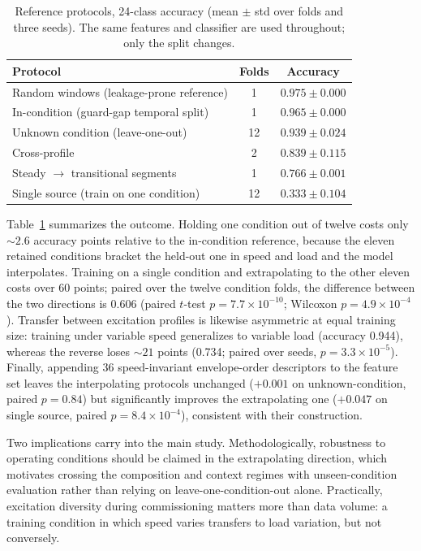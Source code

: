 \begin{table}[!t]
\caption{Reference protocols, 24-class accuracy (mean $\pm$ std over folds
and three seeds). The same features and classifier are used throughout; only
the split changes.}
\label{tab:condref}
\centering
\footnotesize
\setlength{\tabcolsep}{5pt}
\begin{tabular}{l c c}
\hline
Protocol & Folds & Accuracy \\
\hline
Random windows (leakage-prone reference) & 1 & $0.975 \pm 0.000$ \\
In-condition (guard-gap temporal split)  & 1 & $0.965 \pm 0.000$ \\
Unknown condition (leave-one-out)        & 12 & $0.939 \pm 0.024$ \\
Cross-profile                            & 2 & $0.839 \pm 0.115$ \\
Steady $\rightarrow$ transitional segments & 1 & $0.766 \pm 0.001$ \\
Single source (train on one condition)   & 12 & $0.333 \pm 0.104$ \\
\hline
\end{tabular}
\end{table}

Table~\ref{tab:condref} summarizes the outcome. Holding one condition out of
twelve costs only ${\sim}2.6$ accuracy points relative to the in-condition
reference, because the eleven retained conditions bracket the held-out one
in speed and load and the model interpolates. Training on a single condition
and extrapolating to the other eleven costs over 60 points; paired over the
twelve condition folds, the difference between the two directions is 0.606
(paired $t$-test $p = 7.7\times10^{-10}$; Wilcoxon $p = 4.9\times10^{-4}$).
Transfer between excitation profiles is likewise asymmetric at equal
training size: training under variable speed generalizes to variable load
(accuracy 0.944), whereas the reverse loses ${\sim}21$ points (0.734; paired
over seeds, $p = 3.3\times10^{-5}$). Finally, appending 36 speed-invariant
envelope-order descriptors to the feature set leaves the interpolating
protocols unchanged ($+0.001$ on unknown-condition, paired $p = 0.84$) but
significantly improves the extrapolating one ($+0.047$ on single source,
paired $p = 8.4\times10^{-4}$), consistent with their construction.

Two implications carry into the main study. Methodologically, robustness to
operating conditions should be claimed in the extrapolating direction, which
motivates crossing the composition and context regimes with unseen-condition
evaluation rather than relying on leave-one-condition-out alone.
Practically, excitation diversity during commissioning matters more than
data volume: a training condition in which speed varies transfers to load
variation, but not conversely.


